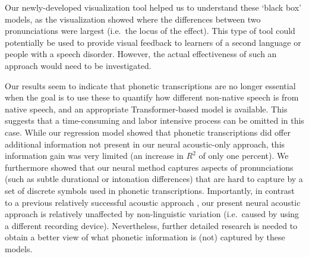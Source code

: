 \documentclass[11pt,a4paper]{article}
\begin{document}
Our newly-developed visualization tool helped us to understand these `black box' models, as the visualization showed where the differences between two pronunciations were largest (i.e.~the locus of the effect). This type of tool could potentially be used to provide visual feedback to learners of a second language or people with a speech disorder. However, the actual effectiveness of such an approach would need to be investigated. 


Our results seem to indicate that phonetic transcriptions are no longer essential when the goal is to use these to quantify how different non-native speech is from native speech, and an appropriate Transformer-based model is available. This suggests that a time-consuming and labor intensive process can be omitted in this case. While our regression model showed that phonetic transcriptions did offer additional information not present in our neural acoustic-only approach, this information gain was very limited (an increase in $R^2$ of only one percent). We furthermore showed that our neural method captures aspects of pronunciations (such as subtle durational or intonation differences) that are hard to capture by a set of discrete symbols used in phonetic transcriptions. Importantly, in contrast to a previous relatively successful acoustic approach \citep{acoustic-measure}, our present neural acoustic approach is relatively unaffected by non-linguistic variation (i.e.~caused by using a different recording device). Nevertheless, further detailed research is needed to obtain a better view of what phonetic information is (not) captured by these models.


\end{document}
